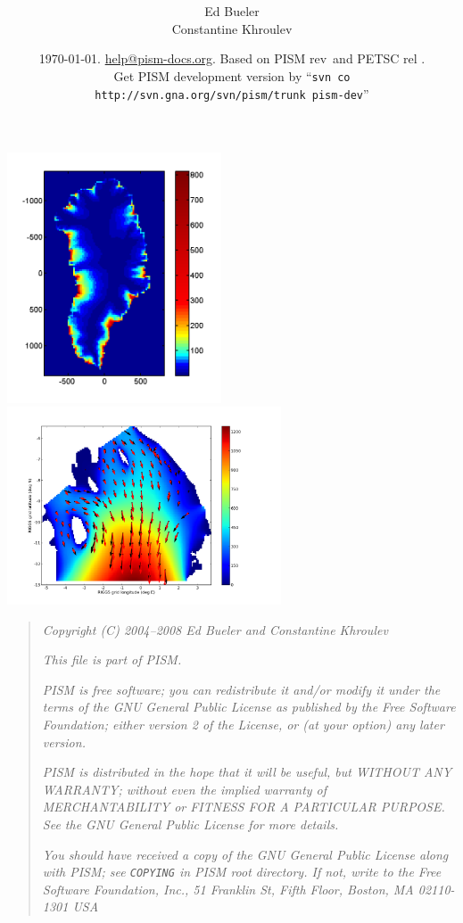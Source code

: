 \documentclass[11pt,final]{amsart}
\title[PISM Installation Manual]{\protect{\Large \emph{PISM}, a Parallel Ice
    Sheet Model:\normalsize} \\ \protect{\Large \bigskip \bigskip Installation
    Manual\normalsize}}
\author[]{Ed Bueler \\ Constantine Khroulev}
\date{\today. \href{mailto:help@pism-docs.org}{help@pism-docs.org}. Based on
  PISM rev \PISMREV\,and PETSC rel \PETSCREL. \\ Get PISM development version
  by ``\quad\texttt{svn co http://svn.gna.org/svn/pism/trunk pism-dev}\quad''}
\newcommand{\normalspacing}{\renewcommand{\baselinestretch}{1.1}\tiny\normalsize}
\begin{document}
\maketitle
\thispagestyle{empty}

\vspace{2.0in}
\begin{center}
\includegraphics[width=2.5in,keepaspectratio=true]{figs/greencbar_SSL2}\, \includegraphics[width=3.2in,keepaspectratio=true]{figs/rossquiver}
\end{center}

\newpage
\phantom{bob}
\vspace{1in}
\begin{quote}
\textsl{Copyright (C) 2004--2008 Ed Bueler and Constantine Khroulev}
\medskip

\noindent \textsl{This file is part of PISM.}
\medskip

\noindent \textsl{PISM is free software; you can redistribute it and/or modify it under the terms of the GNU General Public
  License as published by the Free Software Foundation; either version 2 of the License, or (at your option) any later version.}
\medskip

\noindent \textsl{PISM is distributed in the hope that it will be useful, but WITHOUT ANY WARRANTY; without even the implied
  warranty of MERCHANTABILITY or FITNESS FOR A PARTICULAR PURPOSE. See the GNU General Public License for more details.} \medskip

\noindent \textsl{You should have received a copy of the GNU General Public License along
  with PISM; see \emph{\texttt{COPYING}} in PISM root directory. If not, write to the Free Software Foundation, Inc., 51 Franklin
  St, Fifth Floor, Boston, MA 02110-1301 USA}
\end{quote}
\vspace{1in}
\normalspacing
\end{document}
